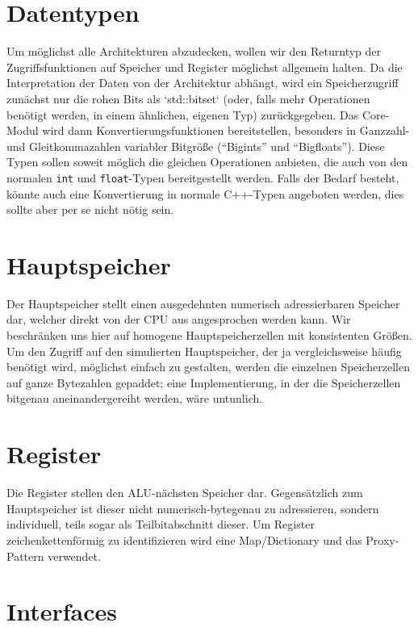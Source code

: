\section{Datentypen}

Um möglichst alle Architekturen abzudecken, wollen wir den Returntyp der Zugriffsfunktionen auf Speicher und Register möglichst allgemein halten. Da die Interpretation der Daten von der Architektur abhängt, wird ein Speicherzugriff zunächst nur die rohen Bits als `std::bitset` (oder, falls mehr Operationen benötigt werden, in einem ähnlichen, eigenen Typ) zurückgegeben. Das Core-Modul wird dann Konvertierungsfunktionen bereitstellen, besonders in Ganzzahl- und Gleitkommazahlen variabler Bitgrö{\ss}e (``Bigints'' und ``Bigfloats''). Diese Typen sollen soweit möglich die gleichen Operationen anbieten, die auch von den normalen \lstinline[style=C++]!int! und \lstinline[style=C++]!float!-Typen bereitgestellt werden. Falls der Bedarf besteht, könnte auch eine Konvertierung in normale C++-Typen angeboten werden, dies sollte aber per se nicht nötig sein.


\section{Hauptspeicher}
Der Hauptspeicher stellt einen ausgedehnten numerisch adressierbaren Speicher dar, welcher direkt von der CPU aus angesprochen werden kann. Wir beschränken uns hier auf homogene Hauptspeicherzellen mit konsistenten Grö{\ss}en. Um den Zugriff auf den simulierten Hauptspeicher, der ja vergleichsweise häufig benötigt wird, möglichst einfach zu gestalten, werden die einzelnen Speicherzellen auf ganze Bytezahlen gepaddet; eine Implementierung, in der die Speicherzellen bitgenau aneinandergereiht werden, wäre untunlich.

\section{Register}
Die Register stellen den ALU-nächsten Speicher dar. Gegensätzlich zum Hauptspeicher ist dieser nicht numerisch-bytegenau zu adressieren, sondern individuell, teils sogar als Teilbitabschnitt dieser.  Um Register zeichenkettenförmig zu identifizieren wird eine Map/Dictionary und das Proxy-Pattern verwendet.

\section{Interfaces}

